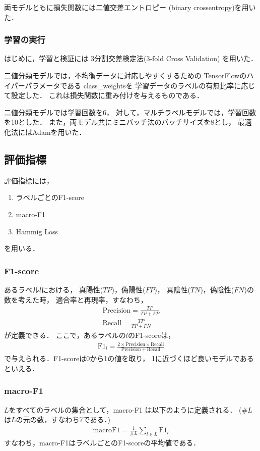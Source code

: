 両モデルともに損失関数には二値交差エントロピー
(binary crossentropy)を用いた．

\subsubsection{学習の実行}
はじめに，学習と検証には
3分割交差検定法(3-fold Cross Validation)
を用いた．

二値分類モデルでは，不均衡データに対応しやすくするための
TensorFlowのハイパーパラメータである
class\_weights\cite{unbalanced-data}を
学習データのラベルの有無比率に応じて設定した．
これは損失関数に重み付けを与えるものである．

二値分類モデルでは学習回数を6，
対して，マルチラベルモデルでは，学習回数を10とした．
また，両モデル共にミニバッチ法のバッチサイズを8とし，
最適化法にはAdamを用いた．

\subsection{評価指標}
評価指標には，
\begin{enumerate}
  \item ラベルごとのF1-score
  \item macro-F1
  \item Hammig Loss
\end{enumerate}
を用いる．
\subsubsection{F1-score}
あるラベル$l$における，
真陽性($TP$)，偽陽性($FP$)，
真陰性($TN$)，偽陰性($FN$)の数を考えた時，
適合率と再現率，すなわち，
\begin{align*}
  \mathrm{Precision} = \frac{TP}{TP+FP} \\
  \mathrm{Recall} = \frac{TP}{TP+FN} 
\end{align*}
が定義できる．
ここで，あるラベルの$l$のF1-scoreは，
\begin{align*}
  \mathrm{F1}_l = \frac{2\times \mathrm{Precision} \times 
  \mathrm{Recall}}{\mathrm{Precision} + \mathrm{Recall}}
\end{align*}
で与えられる．F1-scoreは0から1の値を取り，
1に近づくほど良いモデルであるといえる．
\subsubsection{macro-F1}
$L$をすべてのラベルの集合として，macro-F1
は以下のように定義される．
($\# L$は$L$の元の数，すなわち7である．)
\begin{align*}
  \mathrm{macroF1} = \frac{1}{\# L} \sum_{l \in L} \mathrm{F1}_l
\end{align*}
すなわち，macro-F1はラベルごとのF1-scoreの平均値である．
